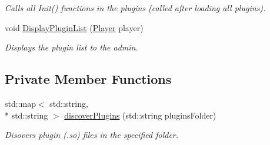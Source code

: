 \begin{DoxyCompactItemize}
\begin{DoxyCompactList}\small\item\em Calls all Init() functions in the plugins (called after loading all plugins). \end{DoxyCompactList}\item 
void \hyperlink{classPluginManager_a8465f355fe0df657e1c6380e67238e3c}{Display\-Plugin\-List} (\hyperlink{structPlayer}{Player} player)
\begin{DoxyCompactList}\small\item\em Displays the plugin list to the admin. \end{DoxyCompactList}\end{DoxyCompactItemize}
\subsection*{Private Member Functions}
\begin{DoxyCompactItemize}
\item 
\hypertarget{classPluginManager_a6e1d97e5b23f0d8f003a518b8b5fb7a1}{std\-::map$<$ std\-::string, \\*
std\-::string $>$ \hyperlink{classPluginManager_a6e1d97e5b23f0d8f003a518b8b5fb7a1}{discover\-Plugins} (std\-::string plugins\-Folder)}\label{classPluginManager_a6e1d97e5b23f0d8f003a518b8b5fb7a1}

\begin{DoxyCompactList}\small\item\em Disovers plugin (.so) files in the specified folder. \end{DoxyCompactList}\end{DoxyCompactItemize}
